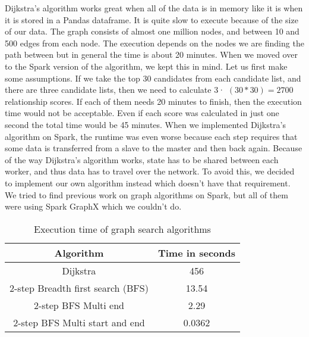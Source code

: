 Dijkstra's algorithm works great when all of the data is in memory like it is when it is stored in a Pandas dataframe. It is quite slow to execute because of the size of our data. The graph consists of almost one million nodes, and between 10 and 500 edges from each node. The execution depends on the nodes we are finding the path between but in general the time is about 20 minutes. When we moved over to the Spark version of the algorithm, we kept this in mind. Let us first make some assumptions. If we take the top 30 candidates from each candidate list, and there are three candidate lists, then we need to calculate 3· $(30*30)=2700$ relationship scores. If each of them needs 20 minutes to finish, then the execution time would not be acceptable. Even if each score was calculated in just one second the total time would be 45 minutes. When we implemented Dijkstra's algorithm on Spark, the runtime was even worse because each step requires that some data is transferred from a slave to the master and then back again. Because of the way Dijkstra's algorithm works, state has to be shared between each worker, and thus data has to travel over the network. To avoid this, we decided to implement our own algorithm instead which doesn’t have that requirement. We tried to find previous work on graph algorithms on Spark, but all of them were using Spark GraphX which we couldn’t do.

\begin{table}[h]
    \centering
        \begin{tabular}{ |c|c| } 
            \hline
            \textbf{Algorithm} & \textbf{Time in seconds} \\ 
            \hline
            Dijkstra & 456 \\ 
            2-step Breadth first search (BFS) & 13.54 \\ 
            2-step BFS Multi end & 2.29 \\ 
            2-step BFS Multi start and end & 0.0362 \\
            \hline
        \end{tabular}
        \caption{Execution time of graph search algorithms}
        \label{SearchAlgorithmTable}
\end{table}

